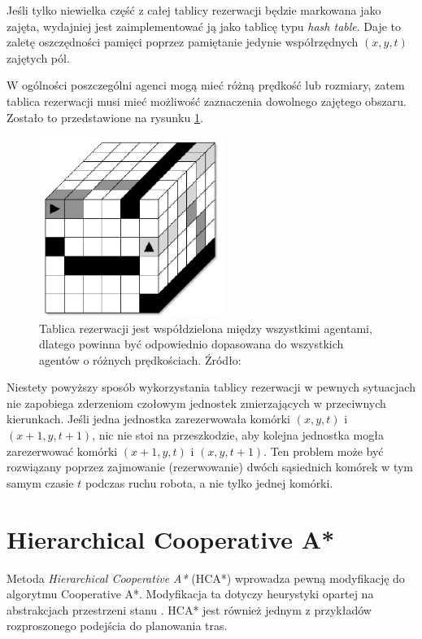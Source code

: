 Jeśli tylko niewielka część z całej tablicy rezerwacji będzie markowana jako zajęta, wydajniej jest zaimplementować ją jako tablicę typu {\it hash table}. Daje to zaletę oszczędności pamięci poprzez pamiętanie jedynie współrzędnych $(x, y, t)$ zajętych pól.

W ogólności poszczególni agenci mogą mieć różną prędkość lub rozmiary, zatem tablica rezerwacji musi mieć możliwość zaznaczenia dowolnego zajętego obszaru. Zostało to przedstawione na rysunku \ref{fig:img_reservation-table-3}.

\begin{figure}
	\centering
	\includegraphics[width=6cm]{img/reservation-table-3}
	\caption{Tablica rezerwacji jest współdzielona między wszystkimi agentami, dlatego powinna być odpowiednio dopasowana do wszystkich agentów o różnych prędkościach. Źródło: \cite{cooppath}}
	\label{fig:img_reservation-table-3}
\end{figure}

Niestety powyższy sposób wykorzystania tablicy rezerwacji w pewnych sytuacjach nie zapobiega zderzeniom czołowym jednostek zmierzających w przeciwnych kierunkach.
Jeśli jedna jednostka zarezerwowała komórki $(x, y, t)$ i $(x + 1, y, t + 1)$, nic nie stoi na przeszkodzie, aby kolejna jednostka mogła zarezerwować komórki $(x + 1, y, t)$ i $(x, y, t + 1)$. Ten problem może być rozwiązany poprzez zajmowanie (rezerwowanie) dwóch sąsiednich komórek w tym samym czasie $t$ podczas ruchu robota, a nie tylko jednej komórki.

\section{Hierarchical Cooperative A*}
\label{ch:hier_cooperative_a}
Metoda {\it Hierarchical Cooperative A*} (HCA*) wprowadza pewną modyfikację do algorytmu Cooperative A*. Modyfikacja ta dotyczy heurystyki opartej na abstrakcjach przestrzeni stanu \cite{cooppath}.
HCA* jest również jednym z przykładów rozproszonego podejścia do planowania tras.

